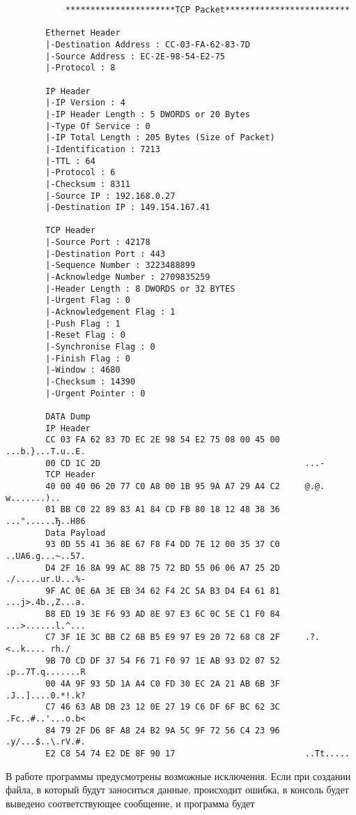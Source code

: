 \begin{verbatim}
            **********************TCP Packet*************************

        Ethernet Header
        |-Destination Address : CC-03-FA-62-83-7D 
        |-Source Address : EC-2E-98-54-E2-75 
        |-Protocol : 8 

        IP Header
        |-IP Version : 4
        |-IP Header Length : 5 DWORDS or 20 Bytes
        |-Type Of Service : 0
        |-IP Total Length : 205 Bytes (Size of Packet)
        |-Identification : 7213
        |-TTL : 64
        |-Protocol : 6
        |-Checksum : 8311
        |-Source IP : 192.168.0.27
        |-Destination IP : 149.154.167.41

        TCP Header
        |-Source Port : 42178
        |-Destination Port : 443
        |-Sequence Number : 3223488899
        |-Acknowledge Number : 2709835259
        |-Header Length : 8 DWORDS or 32 BYTES
        |-Urgent Flag : 0
        |-Acknowledgement Flag : 1
        |-Push Flag : 1
        |-Reset Flag : 0
        |-Synchronise Flag : 0
        |-Finish Flag : 0
        |-Window : 4680
        |-Checksum : 14390
        |-Urgent Pointer : 0

        DATA Dump 
        IP Header
        CC 03 FA 62 83 7D EC 2E 98 54 E2 75 08 00 45 00 	...b.}...T.u..E.
        00 CD 1C 2D                                     	...-
        TCP Header
        40 00 40 06 20 77 C0 A8 00 1B 95 9A A7 29 A4 C2 	@.@. w.......)..
        01 BB C0 22 89 83 A1 84 CD FB 80 18 12 48 38 36 	..."......Ђ..H86
        Data Payload
        93 0D 55 41 36 8E 67 F8 F4 DD 7E 12 00 35 37 C0 	..UA6.g...~..57.
        D4 2F 16 8A 99 AC 8B 75 72 BD 55 06 06 A7 25 2D 	./.....ur.U...%-
        9F AC 0E 6A 3E EB 34 62 F4 2C 5A B3 D4 E4 61 81 	...j>.4b.,Z...a.
        B8 ED 19 3E F6 93 AD 8E 97 E3 6C 0C 5E C1 F0 84 	...>......l.^...
        C7 3F 1E 3C BB C2 6B B5 E9 97 E9 20 72 68 C8 2F 	.?.<..k.... rh./
        9B 70 CD DF 37 54 F6 71 F0 97 1E AB 93 D2 07 52 	.p..7T.q.......R
        00 4A 9F 93 5D 1A A4 C0 FD 30 EC 2A 21 AB 6B 3F 	.J..]....0.*!.k?
        C7 46 63 AB DB 23 12 0E 27 19 C6 DF 6F BC 62 3C 	.Fc..#..'...o.b<
        84 79 2F D6 8F A8 24 B2 9A 5C 9F 72 56 C4 23 96 	.y/...$..\.rV.#.
        E2 C8 54 74 E2 DE 8F 90 17                      	..Tt.....        
\end{verbatim}
\normalsize
В работе программы предусмотрены возможные исключения. Если при 
создании файла, в который будут заноситься данные, происходит ошибка, в 
консоль будет выведено соответствующее сообщение\cite{linux_prog}, и программа будет 

